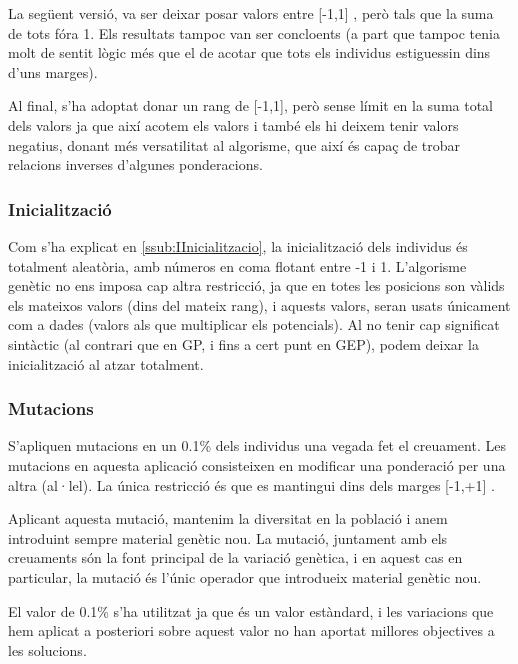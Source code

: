 La següent versió, va ser deixar posar valors entre [-1,1] , però tals que la
suma de tots fóra 1.  Els resultats tampoc van ser concloents (a part que tampoc
tenia molt de sentit lògic més que el de acotar que tots els individus
estiguessin dins d'uns marges).

Al final, s'ha adoptat donar un rang de [-1,1], però sense límit en la suma total
dels valors ja que així acotem els valors i també els hi deixem tenir valors
negatius, donant més versatilitat al algorisme, que així és capaç de trobar
relacions inverses d'algunes ponderacions.



\subsubsection{Inicialització} %
\label{ssub:Inicialitzacio}
Com s'ha explicat en \ref{ssub:IInicialitzacio}, la inicialització dels individus és totalment
aleatòria, amb números en coma flotant entre -1 i 1.  L'algorisme genètic no ens
imposa cap altra restricció, ja que en totes les posicions son vàlids els
mateixos valors (dins del mateix rang), i aquests valors, seran usats únicament
com a dades (valors als que multiplicar els potencials).  Al no tenir cap
significat sintàctic (al contrari que en GP, i fins a cert punt en GEP), podem
deixar la inicialització al atzar totalment.

\subsubsection{Mutacions} %
\label{ssub:Mutacions}

S'apliquen mutacions en un 0.1\% dels individus una vegada fet el creuament.
Les mutacions en aquesta aplicació consisteixen en modificar una ponderació per
una altra (al·lel).  La única restricció és que es mantingui dins dels marges
[-1,+1] .  

Aplicant aquesta mutació, mantenim la diversitat en la població i anem
introduint sempre material genètic nou.  La mutació, juntament amb els
creuaments són la font principal de la variació genètica, i en aquest cas en
particular, la mutació és l'únic operador que introdueix material genètic nou.

El valor de 0.1\% s'ha utilitzat ja que és un valor estàndard, i les variacions
que hem aplicat a posteriori sobre aquest valor no han aportat millores
objectives a les solucions.

